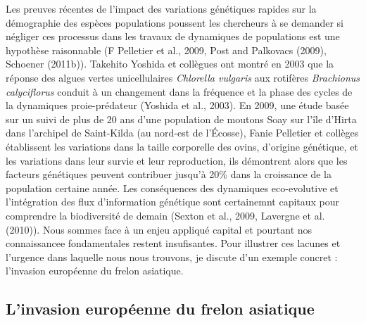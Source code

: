Les preuves récentes de l'impact des variations génétiques rapides sur
la démographie des espèces populations poussent les chercheurs à se
demander si négliger ces processus dans les travaux de dynamiques de
populations est une hypothèse raisonnable (F Pelletier et al., 2009,
Post and Palkovacs (2009), Schoener (2011b)). Takehito Yoshida et
collègues ont montré en 2003 que la réponse des algues vertes
unicellulaires \emph{Chlorella vulgaris} aux rotifères \emph{Brachionus
calyciflorus} conduit à un changement dans la fréquence et la phase des
cycles de la dynamiques proie-prédateur (Yoshida et al., 2003). En 2009,
une étude basée sur un suivi de plus de 20 ans d'une population de
moutons Soay sur l'île d'Hirta dans l'archipel de Saint-Kilda (au
nord-est de l'Écosse), Fanie Pelletier et collèges établissent les
variations dans la taille corporelle des ovins, d'origine génétique, et
les variations dans leur survie et leur reproduction, ils démontrent
alors que les facteurs génétiques peuvent contribuer jusqu'à 20\% dans
la croissance de la population certaine année. Les conséquences des
dynamiques eco-evolutive et l'intégration des flux d'information
génétique sont certainemnt capitaux pour comprendre la biodiversité de
demain (Sexton et al., 2009, Lavergne et al. (2010)). Nous sommes face à
un enjeu appliqué capital et pourtant nos connaissancee fondamentales
restent insufisantes. Pour illustrer ces lacunes et l'urgence dans
laquelle nous nous trouvons, je discute d'un exemple concret :
l'invasion européenne du frelon asiatique.

\subsection*{L'invasion européenne du frelon
asiatique}\label{linvasion-europuxe9enne-du-frelon-asiatique}

